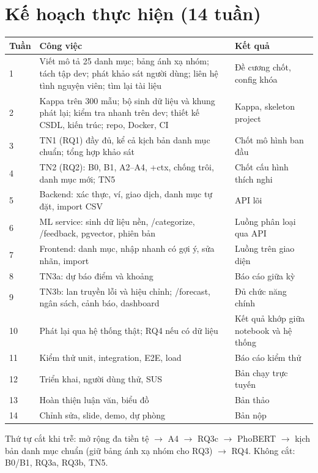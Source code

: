 \documentclass[12pt,a4paper]{article}
\begin{document}
\section{Kế hoạch thực hiện (14 tuần)}
\begin{longtable}{@{}p{1.2cm}>{\raggedright\arraybackslash}p{9.4cm}>{\raggedright\arraybackslash}p{4.2cm}@{}}
\toprule
Tuần & Công việc & Kết quả \\
\midrule
\endhead
1 & Viết mô tả 25 danh mục; bảng ánh xạ nhóm; tách tập dev; phát khảo sát người dùng; liên hệ tình nguyện viên; tìm lại tài liệu & Đề cương chốt, config khóa \\
2 & Kappa trên 300 mẫu; bộ sinh dữ liệu và khung phát lại; kiểm tra nhanh trên dev; thiết kế CSDL, kiến trúc; repo, Docker, CI & Kappa, skeleton project \\
3 & TN1 (RQ1) đầy đủ, kể cả kịch bản danh mục chuẩn; tổng hợp khảo sát & Chốt mô hình ban đầu \\
4 & TN2 (RQ2): B0, B1, A2--A4, +ctx, chống trôi, danh mục mới; TN5 & Chốt cấu hình thích nghi \\
5 & Backend: xác thực, ví, giao dịch, danh mục tự đặt, import CSV & API lõi \\
6 & ML service: sinh dữ liệu nền, /categorize, /feedback, pgvector, phiên bản & Luồng phân loại qua API \\
7 & Frontend: danh mục, nhập nhanh có gợi ý, sửa nhãn, import & Luồng trên giao diện \\
8 & TN3a: dự báo điểm và khoảng & Báo cáo giữa kỳ \\
9 & TN3b: lan truyền lỗi và hiệu chỉnh; /forecast, ngân sách, cảnh báo, dashboard & Đủ chức năng chính \\
10 & Phát lại qua hệ thống thật; RQ4 nếu có dữ liệu & Kết quả khớp giữa notebook và hệ thống \\
11 & Kiểm thử unit, integration, E2E, load & Báo cáo kiểm thử \\
12 & Triển khai, người dùng thử, SUS & Bản chạy trực tuyến \\
13 & Hoàn thiện luận văn, biểu đồ & Bản thảo \\
14 & Chỉnh sửa, slide, demo, dự phòng & Bản nộp \\
\bottomrule
\end{longtable}
Thứ tự cắt khi trễ: mở rộng đa tiền tệ $\to$ A4 $\to$ RQ3c $\to$ PhoBERT $\to$ kịch bản danh mục chuẩn (giữ bảng ánh xạ nhóm cho RQ3) $\to$ RQ4. Không cắt: B0/B1, RQ3a, RQ3b, TN5.

\end{document}
